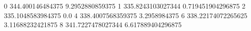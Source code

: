 0 344.400146484375 9.2952880859375
1 335.8243103027344 0.719451904296875
2 335.1048583984375 0.0
4 338.4007568359375 3.2958984375
6 338.22174072265625 3.11688232421875
8 341.7227478027344 6.617889404296875
